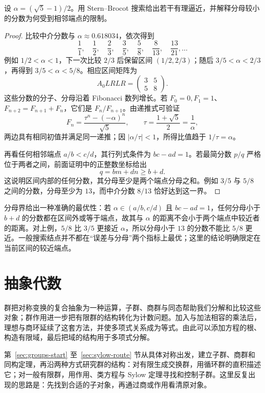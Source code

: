 \documentclass[lang=cn,a4paper,fontset=none,zihao=false,10pt,openany,twoside]{beautybook}
\numberwithin{algorithm}{chapter}
\begin{document}
\begin{example}[逼近黄金比例的倒数]
设 $\alpha=(\sqrt5-1)/2$。用 Stern--Brocot 搜索给出若干有理逼近，并解释分母较小的分数为何受到相邻端点的限制。
\end{example}
\begin{proof}
比较中介分数与 $\alpha\approx0.618034$，依次得到
\[
 \frac11,\quad\frac12,\quad\frac23,\quad\frac35,
 \quad\frac58,\quad\frac8{13},\quad\frac{13}{21},\ldots
\]
例如 $1/2<\alpha<1$，下一次比较 $2/3$ 后保留区间 $(1/2,2/3)$；随后 $3/5<\alpha<2/3$，再得到 $3/5<\alpha<5/8$。相应区间矩阵为
\[
 A_0LRLR=\begin{pmatrix}3&5\\5&8\end{pmatrix}.
\]
这些分数的分子、分母沿着 Fibonacci 数列增长。若 $F_0=0,F_1=1$、$F_{n+2}=F_{n+1}+F_n$，它们是 $F_n/F_{n+1}$。由递推式可验证
\[
 F_n=\frac{\tau^n-(-\alpha)^n}{\sqrt5},\qquad
 \tau=\frac{1+\sqrt5}{2}=\frac1\alpha,
\]
两边具有相同初值并满足同一递推；因 $|\alpha/\tau|<1$，所得比值趋于 $1/\tau=\alpha$。

再看任何相邻端点 $a/b<c/d$，其行列式条件为 $bc-ad=1$。若最简分数 $p/q$ 严格位于两者之间，前面证明中的正整数坐标给出
\[
 q=bm+dn\ge b+d.
\]
这说明区间内部的任何分数，其分母至少是两个端点分母之和。例如 $3/5$ 与 $5/8$ 之间的分数，分母至少为 $13$，而中介分数 $8/13$ 恰好达到这一界。
\end{proof}
\begin{remark}[逼近精度与分母大小]
分母界给出一种准确的最优性：若 $\alpha\in(a/b,c/d)$ 且 $bc-ad=1$，任何分母小于 $b+d$ 的分数都在区间外或等于端点，故其与 $\alpha$ 的距离不会小于两个端点中较近者的距离。对上例，$5/8$ 比 $3/5$ 更接近 $\alpha$，所以分母小于 $13$ 的分数不能比 $5/8$ 更近。一般搜索结点并不都在“误差与分母”两个指标上最优；这里的结论明确限定在当前区间的较近端点。
\end{remark}

\chapter{抽象代数}\label{chap:abstract-algebra}
\begin{wenxintishi}
群把对称变换的复合抽象为一种运算，子群、商群与同态帮助我们分解和比较这些对象；群作用进一步把有限群的结构转化为计数问题。加入与加法相容的乘法后，理想与商环延续了这套方法，并使多项式关系成为等式。由此可以添加方程的根、构造有限域，最后把域的结构用于多项式分解。
\end{wenxintishi}
第~\ref{sec:groups-start} 至~\ref{sec:sylow-route} 节从具体对称出发，建立子群、商群和同构定理，再沿两种方式研究群的结构：对有限生成交换群，用循环群的直积描述它；对一般有限群，用作用、类方程与 Sylow 定理寻找和控制子群。这里反复出现的思路是：先找到合适的子对象，再通过商或作用看清原对象。
\end{document}
